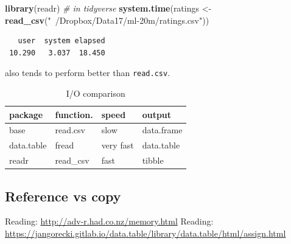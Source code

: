 \documentclass[]{book}
\newenvironment{Shaded}{\begin{snugshade}}{\end{snugshade}}
\newcommand{\KeywordTok}[1]{\textcolor[rgb]{0.13,0.29,0.53}{\textbf{#1}}}
\newcommand{\DecValTok}[1]{\textcolor[rgb]{0.00,0.00,0.81}{#1}}
\newcommand{\StringTok}[1]{\textcolor[rgb]{0.31,0.60,0.02}{#1}}
\newcommand{\CommentTok}[1]{\textcolor[rgb]{0.56,0.35,0.01}{\textit{#1}}}
\newcommand{\OperatorTok}[1]{\textcolor[rgb]{0.81,0.36,0.00}{\textbf{#1}}}
\newcommand{\ErrorTok}[1]{\textcolor[rgb]{0.64,0.00,0.00}{\textbf{#1}}}
\newcommand{\NormalTok}[1]{#1}
\theoremstyle{definition}
\theoremstyle{definition}
\theoremstyle{definition}
\theoremstyle{remark}
\begin{document}
\begin{Shaded}
\begin{Highlighting}[]
\KeywordTok{library}\NormalTok{(readr) }\CommentTok{# in tidyverse}
\KeywordTok{system.time}\NormalTok{(ratings <-}\StringTok{ }\KeywordTok{read_csv}\NormalTok{(}\StringTok{"~/Dropbox/Data17/ml-20m/ratings.csv"}\NormalTok{))}
\end{Highlighting}
\end{Shaded}

\begin{verbatim}
   user  system elapsed 
 10.290   3.037  18.450 
\end{verbatim}

also tends to perform better than \texttt{read.csv}.

\begin{table}

\caption{\label{tab:unnamed-chunk-115}I/O comparison}
\centering
\begin{tabular}[t]{l|l|l|l}
\hline
package & function. & speed & output\\
\hline
base & read.csv & slow & data.frame\\
\hline
data.table & fread & very fast & data.table\\
\hline
readr & read\_csv & fast & tibble\\
\hline
\end{tabular}
\end{table}

\subsection{Reference vs copy}\label{reference-vs-copy}

Reading: \url{http://adv-r.had.co.nz/memory.html} Reading:
\url{https://jangorecki.gitlab.io/data.table/library/data.table/html/assign.html}

\begin{Shaded}
\end{Shaded}
\end{document}
